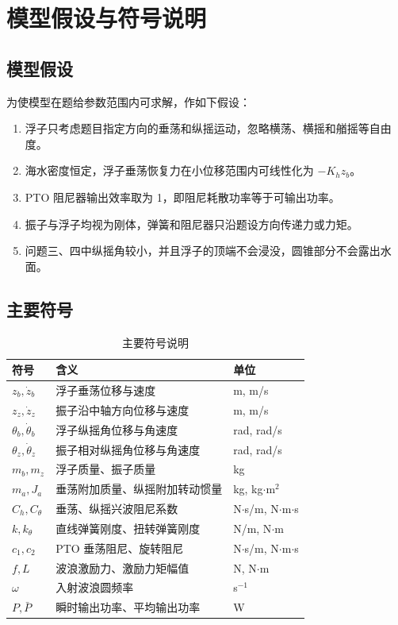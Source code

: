 \section{模型假设与符号说明}

\subsection{模型假设}

为使模型在题给参数范围内可求解，作如下假设：

\begin{enumerate}
  \item 浮子只考虑题目指定方向的垂荡和纵摇运动，忽略横荡、横摇和艏摇等自由度。
  \item 海水密度恒定，浮子垂荡恢复力在小位移范围内可线性化为 $-K_h z_b$。
  \item PTO 阻尼器输出效率取为 1，即阻尼耗散功率等于可输出功率。
  \item 振子与浮子均视为刚体，弹簧和阻尼器只沿题设方向传递力或力矩。
  \item 问题三、四中纵摇角较小，并且浮子的顶端不会浸没，圆锥部分不会露出水面。
\end{enumerate}

\subsection{主要符号}

\begin{table}[H]
\centering
\caption{主要符号说明}
\begin{tabular}{lll}
\toprule
符号 & 含义 & 单位 \\
\midrule
$z_b,\dot z_b$ & 浮子垂荡位移与速度 & m, m/s \\
$z_z,\dot z_z$ & 振子沿中轴方向位移与速度 & m, m/s \\
$\theta_b,\dot\theta_b$ & 浮子纵摇角位移与角速度 & rad, rad/s \\
$\theta_z,\dot\theta_z$ & 振子相对纵摇角位移与角速度 & rad, rad/s \\
$m_b,m_z$ & 浮子质量、振子质量 & kg \\
$m_a,J_a$ & 垂荡附加质量、纵摇附加转动惯量 & kg, kg$\cdot$m$^2$ \\
$C_h,C_\theta$ & 垂荡、纵摇兴波阻尼系数 & N$\cdot$s/m, N$\cdot$m$\cdot$s \\
$k,k_\theta$ & 直线弹簧刚度、扭转弹簧刚度 & N/m, N$\cdot$m \\
$c_1,c_2$ & PTO 垂荡阻尼、旋转阻尼 & N$\cdot$s/m, N$\cdot$m$\cdot$s \\
$f,L$ & 波浪激励力、激励力矩幅值 & N, N$\cdot$m \\
$\omega$ & 入射波浪圆频率 & s$^{-1}$ \\
$P,\bar P$ & 瞬时输出功率、平均输出功率 & W \\
\bottomrule
\end{tabular}
\end{table}
